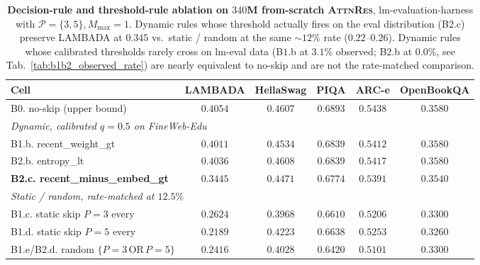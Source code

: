 \documentclass{article}
\newcommand{\attnres}{\textsc{AttnRes}}
\begin{document}
\begin{table}[h]
\caption{\textbf{Decision-rule and threshold-rule ablation on $340$M from-scratch \attnres{}}, lm-evaluation-harness with $\mathcal{P}{=}\{3,5\}, M_{\max}{=}1$. Dynamic rules whose threshold actually fires on the eval distribution (B$2.$c) preserve LAMBADA at $0.345$ vs.\ static / random at the same $\sim$$12\%$ rate ($0.22$--$0.26$). Dynamic rules whose calibrated thresholds rarely cross on lm-eval data (B$1.$b at $3.1\%$ observed; B$2.$b at $0.0\%$, see Tab.~\ref{tab:b1b2_observed_rate}) are nearly equivalent to no-skip and are not the rate-matched comparison.}
\label{tab:b1b2_decision_rule}
\centering\small
\setlength{\tabcolsep}{4pt}
\begin{tabular}{lccccc}
\toprule
Cell & LAMBADA & HellaSwag & PIQA & ARC-e & OpenBookQA \\
\midrule
B0. no-skip (upper bound)                    & $0.4054$ & $0.4607$ & $0.6893$ & $0.5438$ & $0.3580$ \\
\midrule
\multicolumn{6}{l}{\emph{Dynamic, calibrated $q{=}0.5$ on FineWeb-Edu}} \\
B1.b. recent\_weight\_gt                     & $0.4011$ & $0.4534$ & $0.6839$ & $0.5412$ & $0.3580$ \\
B2.b. entropy\_lt                            & $0.4036$ & $0.4608$ & $0.6839$ & $0.5417$ & $0.3580$ \\
\textbf{B2.c. recent\_minus\_embed\_gt}      & $\mathbf{0.3445}$ & $\mathbf{0.4471}$ & $\mathbf{0.6774}$ & $\mathbf{0.5391}$ & $\mathbf{0.3540}$ \\
\midrule
\multicolumn{6}{l}{\emph{Static / random, rate-matched at $12.5\%$}} \\
B1.c. static skip $P{=}3$ every              & $0.2624$ & $0.3968$ & $0.6610$ & $0.5206$ & $0.3300$ \\
B1.d. static skip $P{=}5$ every              & $0.2189$ & $0.4223$ & $0.6638$ & $0.5253$ & $0.3260$ \\
B1.e/B2.d. random $\{P{=}3$\,OR\,$P{=}5\}$   & $0.2416$ & $0.4028$ & $0.6420$ & $0.5101$ & $0.3300$ \\
\bottomrule
\end{tabular}
\end{table}
\end{document}
